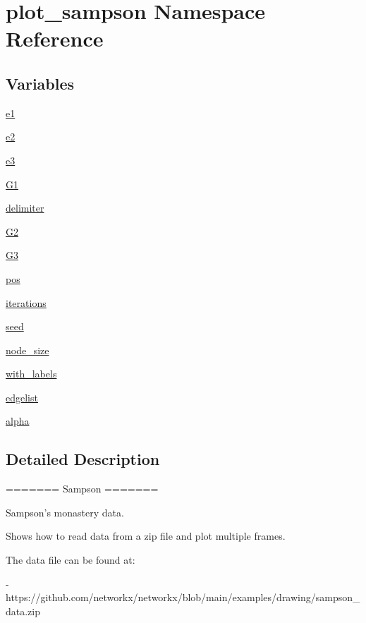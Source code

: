 \hypertarget{namespaceplot__sampson}{}\section{plot\+\_\+sampson Namespace Reference}
\label{namespaceplot__sampson}
\subsection*{Variables}
\begin{DoxyCompactItemize}
\item 
\hyperlink{namespaceplot__sampson_a6c0a77a845b6f6e735ca73c06313eacd}{e1}
\item 
\hyperlink{namespaceplot__sampson_a6ca55375494df6d783414e5449f11afa}{e2}
\item 
\hyperlink{namespaceplot__sampson_a82a23e900bfb87fafbff47b947b5630e}{e3}
\item 
\hyperlink{namespaceplot__sampson_ab3d4a4a12b76f7105d7840ea61309878}{G1}
\item 
\hyperlink{namespaceplot__sampson_a327619b53d888ca2904d23578c2d7da1}{delimiter}
\item 
\hyperlink{namespaceplot__sampson_af5ce601148eb803b077ef1d4a67618ca}{G2}
\item 
\hyperlink{namespaceplot__sampson_a111c151f295c3e4f4a8346da794cac5a}{G3}
\item 
\hyperlink{namespaceplot__sampson_a0a4cc4eff262f8834b17ea6af2ec70a6}{pos}
\item 
\hyperlink{namespaceplot__sampson_a0b99cddcc5904a7f0d17a6047d96877e}{iterations}
\item 
\hyperlink{namespaceplot__sampson_a0d286edb68918eb7c3e21ad260ae8e60}{seed}
\item 
\hyperlink{namespaceplot__sampson_a9ed09ba8e76d9c07917f25bd9e324888}{node\+\_\+size}
\item 
\hyperlink{namespaceplot__sampson_ab8b779271ccf71bddd479c220f56d8b3}{with\+\_\+labels}
\item 
\hyperlink{namespaceplot__sampson_a762d027ffda48b8384fcdf5b295ec6c8}{edgelist}
\item 
\hyperlink{namespaceplot__sampson_a9d18114c17769cc0533aff77aa6b3cbc}{alpha}
\end{DoxyCompactItemize}


\subsection{Detailed Description}
\begin{DoxyVerb}=======
Sampson
=======

Sampson's monastery data.

Shows how to read data from a zip file and plot multiple frames.

The data file can be found at:

- https://github.com/networkx/networkx/blob/main/examples/drawing/sampson_data.zip
\end{DoxyVerb}
 

